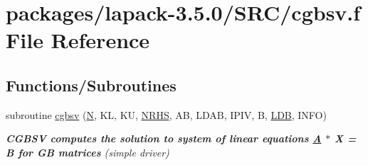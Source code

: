\hypertarget{cgbsv_8f}{}\section{packages/lapack-\/3.5.0/\+S\+R\+C/cgbsv.f File Reference}
\label{cgbsv_8f}
\subsection*{Functions/\+Subroutines}
\begin{DoxyCompactItemize}
\item 
subroutine \hyperlink{group__complexGBsolve_ga9b44557f795536a0e2c2949b894022f7}{cgbsv} (\hyperlink{polmisc_8c_a0240ac851181b84ac374872dc5434ee4}{N}, K\+L, K\+U, \hyperlink{example__user_8c_aa0138da002ce2a90360df2f521eb3198}{N\+R\+H\+S}, A\+B, L\+D\+A\+B, I\+P\+I\+V, B, \hyperlink{example__user_8c_a50e90a7104df172b5a89a06c47fcca04}{L\+D\+B}, I\+N\+F\+O)
\begin{DoxyCompactList}\small\item\em {\bfseries  C\+G\+B\+S\+V computes the solution to system of linear equations \hyperlink{classA}{A} $\ast$ X = B for G\+B matrices} (simple driver) \end{DoxyCompactList}\end{DoxyCompactItemize}
